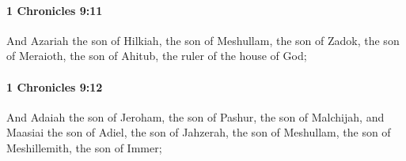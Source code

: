 		\paragraph{1 Chronicles 9:11} %
			\label{1CHRONICLES-9-11}

			And Azariah the son of Hilkiah, the son of Meshullam, the son of Zadok, the son of Meraioth, the son of Ahitub, the ruler of the house of God;


		\paragraph{1 Chronicles 9:12} %
			\label{1CHRONICLES-9-12}

			And Adaiah the son of Jeroham, the son of Pashur, the son of Malchijah, and Maasiai the son of Adiel, the son of Jahzerah, the son of Meshullam, the son of Meshillemith, the son of Immer;


